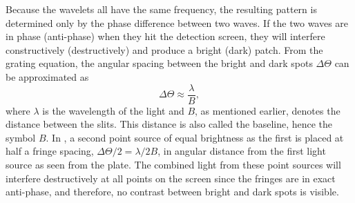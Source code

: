 Because the wavelets all have the same frequency, the resulting pattern is determined only by the phase difference between two waves. If the two waves are in phase (anti-phase) when they hit the detection screen, they will interfere constructively (destructively) and produce a bright (dark) patch. 
From the grating equation, the angular spacing between the bright and dark spots $\Delta \Theta$ can be approximated as
\begin{equation}
\label{eq:angularspacing}
\Delta \Theta \approx \frac{\lambda}{B},
\end{equation}
where $\lambda$ is the wavelength of the light and $B$, as mentioned earlier, denotes the distance between the slits. This distance is also called the baseline, hence the symbol $B$. 
In , a second point source of equal brightness as the first is placed at half a fringe spacing,  ${\Delta \Theta}/{2} = {\lambda}/{2 B}$, in angular distance from the first light source as seen from the plate. 
The combined light from these point sources will interfere destructively at all points  on the screen since the fringes are in exact anti-phase, and therefore, no contrast between bright and dark spots is visible.

